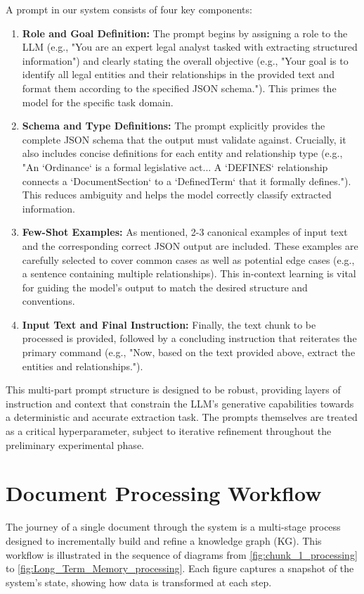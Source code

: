 A prompt in our system consists of four key components:
\begin{enumerate}
    \item \textbf{Role and Goal Definition:} The prompt begins by assigning a role to the LLM (e.g., "You are an expert legal analyst tasked with extracting structured information") and clearly stating the overall objective (e.g., "Your goal is to identify all legal entities and their relationships in the provided text and format them according to the specified JSON schema."). This primes the model for the specific task domain.
    \item \textbf{Schema and Type Definitions:} The prompt explicitly provides the complete JSON schema that the output must validate against. Crucially, it also includes concise definitions for each entity and relationship type (e.g., "An `Ordinance` is a formal legislative act... A `DEFINES` relationship connects a `DocumentSection` to a `DefinedTerm` that it formally defines."). This reduces ambiguity and helps the model correctly classify extracted information.
    \item \textbf{Few-Shot Examples:} As mentioned, 2-3 canonical examples of input text and the corresponding correct JSON output are included. These examples are carefully selected to cover common cases as well as potential edge cases (e.g., a sentence containing multiple relationships). This in-context learning is vital for guiding the model's output to match the desired structure and conventions.
    \item \textbf{Input Text and Final Instruction:} Finally, the text chunk to be processed is provided, followed by a concluding instruction that reiterates the primary command (e.g., "Now, based on the text provided above, extract the entities and relationships.").
\end{enumerate}
This multi-part prompt structure is designed to be robust, providing layers of instruction and context that constrain the LLM's generative capabilities towards a deterministic and accurate extraction task. The prompts themselves are treated as a critical hyperparameter, subject to iterative refinement throughout the preliminary experimental phase.

\section{Document Processing Workflow}
The journey of a single document through the system is a multi-stage process designed to incrementally build and refine a knowledge graph (KG). This workflow is illustrated in the sequence of diagrams from \cref{fig:chunk_1_processing} to \cref{fig:Long_Term_Memory_processing}. Each figure captures a snapshot of the system's state, showing how data is transformed at each step.

